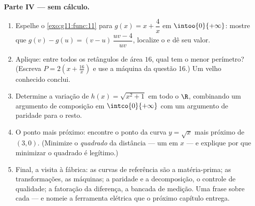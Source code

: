 \begin{problem}
\medskip
\noindent\textbf{Parte IV ---  sem cálculo.}
\begin{enumerate}[resume]
  \item Espelhe o \cref{exo:g11:func:11} para
        $g(x) = x + \dfrac4x$ em $\intoo{0}{+\infty}$: mostre que
        $g(v) - g(u) = (v - u)\,\dfrac{uv - 4}{uv}$, localize o
         e dê seu valor.
  \item Aplique: entre todos os retângulos de área $16$, qual tem
        o menor perímetro? (Escreva $P = 2\left(x +
        \frac{16}{x}\right)$ e use a máquina da questão 16.) Um
        velho conhecido conclui.
  \item Determine a variação de $h(x) = \sqrt{x^2 + 1}$ em todo o
        $\R$, combinando um argumento de composição em
        $\intco{0}{+\infty}$ com um argumento de paridade para o
        resto.
  \item O ponto mais próximo: encontre o ponto da curva
        $y = \sqrt x$ mais próximo de $(3, 0)$. (Minimize o
        \emph{quadrado} da distância --- um  em $x$ --- e explique por que minimizar o quadrado é
        legítimo.)
  \item Final, a visita à fábrica: as curvas de referência são a
        matéria-prima; as transformações, as máquinas; a paridade
        e a decomposição, o controle de qualidade; a fatoração da
        diferença, a bancada de medição. Uma frase sobre cada ---
        e nomeie a ferramenta elétrica que o próximo capítulo
        entrega.
\end{enumerate}
\end{problem}
